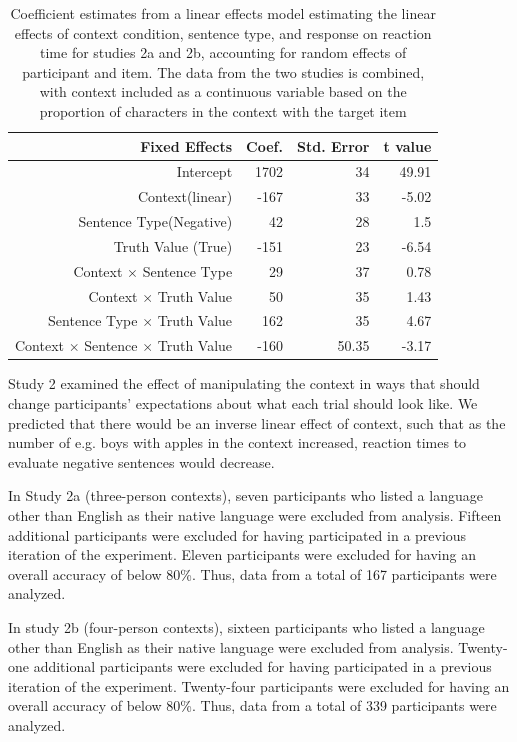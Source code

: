 \documentclass[10pt,letterpaper]{article}
\begin{document}
\begin{table}[t]
\caption{\label{tab:e2model}Coefficient estimates from a linear effects model estimating the linear effects of context condition, sentence type, and response on reaction time for studies 2a and 2b, accounting for random effects of participant and item.  The data from the two studies is combined, with context included as a continuous variable based on the proportion of characters in the context with the target item}
\begin{center}
\small\addtolength{\tabcolsep}{-5pt}
\begin{tabular}{ r  r  r  r  } 
\hline
  \bf{Fixed Effects} & \bf{Coef.} & \bf{Std. Error} & \bf{t value} \\ \hline        
  Intercept & 1702 & 34 & 49.91\\     
Context(linear) &-167 & 33 & -5.02\\
Sentence Type(Negative) &  42 & 28 & 1.5\\
Truth Value (True) & -151 &   23 &  -6.54\\
Context $\times$ Sentence Type& 29 &   37  &  0.78\\
Context $\times$ Truth Value & 50  &   35  &  1.43\\
Sentence Type $\times$ Truth Value &  162 &   35  &  4.67\\
Context $\times$ Sentence $\times$ Truth Value & -160  &   50.35 &  -3.17\\
\hline
\end{tabular}
\end{center}
\end{table}

Study 2 examined the effect of manipulating the context in ways that should change participants' expectations about what each trial should look like.  We predicted that there would be an inverse linear effect of context, such that as the number of e.g. boys with apples in the context increased, reaction times to evaluate negative sentences would decrease.  

In Study 2a (three-person contexts), seven participants who listed a language other than English as their native language were excluded from analysis.  Fifteen additional participants were excluded for having participated in a previous iteration of the experiment.  Eleven participants were excluded for having an overall accuracy of below 80\%.  Thus, data from a total of 167 participants were analyzed.  

In study 2b (four-person contexts), sixteen participants who listed a language other than English as their native language were excluded from analysis.  Twenty-one additional participants were excluded for having participated in a previous iteration of the experiment.  Twenty-four participants were excluded for having an overall accuracy of below 80\%.  Thus, data from a total of 339 participants were analyzed.  
\end{document}
